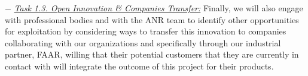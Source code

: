 \documentclass[a4paper,11pt]{article}
\begin{document}
\begin{itemize}[leftmargin=.2in,noitemsep,nolistsep]
{{%
}
\subitem$-$  \underline{\it Task 1.3. Open Innovation \& Companies Transfer:}
Finally, we will also engage with professional bodies and with the ANR team to identify other opportunities for exploitation by considering ways to transfer this innovation to companies collaborating with our organizations and specifically through our industrial partner, FAAR, willing that their potential customers that they are currently in contact with will integrate the outcome of this project for their products. 
}

\end{itemize}
\end{document}
